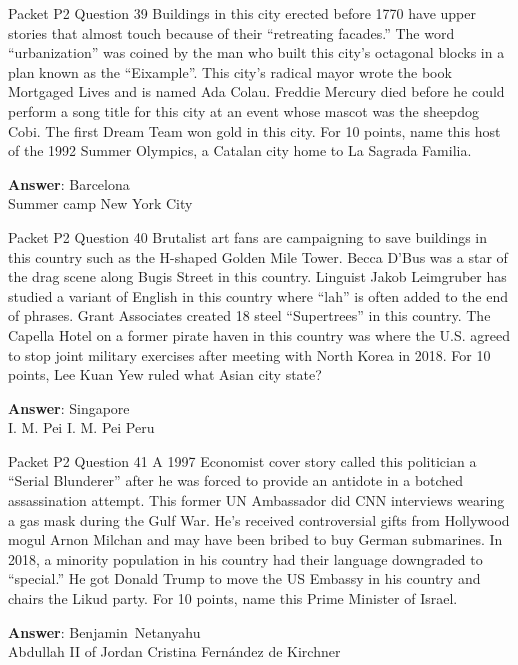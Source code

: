 \begin{frame}{Packet P2 Question 39}
Buildings in this city   erected before 1770 have upper stories that almost touch because of their ``retreating facades.'' The word ``urbanization'' was coined by the man who built this city’s octagonal blocks in a plan known as   the ``Eixample''. This   city’s radical mayor wrote the book Mortgaged Lives and is named Ada Colau. Freddie Mercury died before he could perform   a song title for this city at an event whose mascot was the sheepdog Cobi. The first Dream Team won gold in this city. For 10 points, name this host of the 1992 Summer Olympics, a Catalan city home to La Sagrada Familia.  

\textbf{Answer}: Barcelona\\
 Summer camp
 New York City
\end{frame}

\begin{frame}{Packet P2 Question 40}
Brutalist art fans are campaigning to save buildings in this country   such as the H-shaped Golden Mile Tower. Becca D'Bus was a star of the drag scene along Bugis Street in this country. Linguist Jakob Leimgruber has studied a variant of English in this country where ``lah'' is often added to the end of phrases. Grant Associates created 18 steel “Supertrees” in this country. The Capella Hotel on a former pirate haven in this country was where the U.S. agreed to stop joint military exercises after meeting with North Korea in 2018. For 10 points, Lee Kuan Yew ruled     what Asian city state?    

\textbf{Answer}: Singapore\\
 I. M. Pei
 I. M. Pei
 Peru
\end{frame}

\begin{frame}{Packet P2 Question 41}
A 1997 Economist cover story called this politician a “Serial Blunderer” after he was forced to provide an antidote in a botched assassination attempt. This former   UN Ambassador did CNN interviews wearing a gas mask during the Gulf War. He’s received controversial gifts from Hollywood mogul Arnon Milchan and may have been bribed to buy German submarines. In 2018, a minority population in his country had their language downgraded to “special.” He got Donald Trump to move the US Embassy in his country and chairs the Likud party. For 10 points, name this Prime   Minister of Israel.      

\textbf{Answer}: Benjamin\ Netanyahu\\
 Abdullah II of Jordan
 Cristina Fernández de Kirchner
\end{frame}

